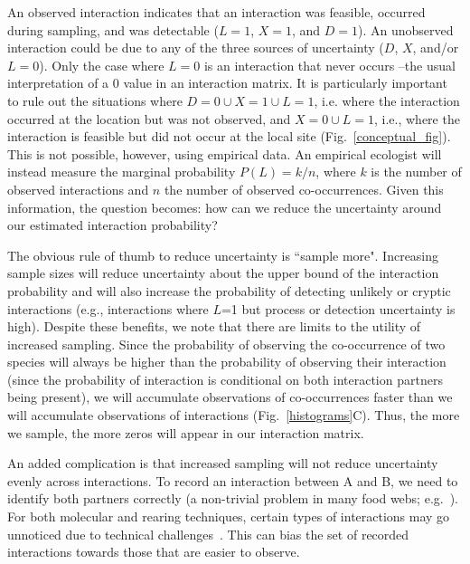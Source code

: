 \documentclass[12pt]{article}
\begin{document}
\begin{spacing}{2.0}
        An observed interaction indicates that an interaction was feasible, occurred during sampling, and was detectable ($L = 1$, $X = 1$, and $D = 1$). An unobserved interaction could be due to any of the three sources of uncertainty ($D$, $X$, and/or $L = 0$). Only the case where $L = 0$ is an interaction that never occurs --the usual interpretation of a $0$ value in an interaction matrix. It is particularly important to rule out the situations where $D=0 \cup X = 1 \cup L=1$, i.e. where the interaction occurred at the location but was not observed, and $X = 0 \cup L =1$, i.e., where the interaction is feasible but did not occur at the local site (Fig.~\ref{conceptual_fig}). 
        This is not possible, however, using empirical data. An empirical ecologist will instead measure the marginal probability $P(L) = k/n$, where $k$ is the number of observed interactions and $n$ the number of observed co-occurrences. Given this information, the question becomes: how can we reduce the uncertainty around our estimated interaction probability?


        The obvious rule of thumb to reduce uncertainty is ``sample more". Increasing sample sizes will reduce uncertainty about the upper bound of the interaction probability and will also increase the probability of detecting unlikely or cryptic interactions (e.g., interactions where $L$=1 but process or detection uncertainty is high). Despite these benefits, we note that there are limits to the utility of increased sampling. Since the probability of observing the co-occurrence of two species will always be higher than the probability of observing their interaction (since the probability of interaction is conditional on both interaction partners being present), we will accumulate observations of co-occurrences faster than we will accumulate observations of interactions (Fig.~\ref{histograms}C). Thus, the more we sample, the more zeros will appear in our interaction matrix.


        An added complication is that increased sampling will not reduce uncertainty evenly across interactions. To record an interaction between A and B, we need to identify both partners correctly (a non-trivial problem in many food webs; e.g.~\citealp{Kaartinen2011,Roslin2016}). For both molecular and rearing techniques, certain types of interactions may go unnoticed due to technical challenges~\citep{Wirta2014}. This can bias the set of recorded interactions towards those that are easier to observe.



\end{spacing}
\end{document}
